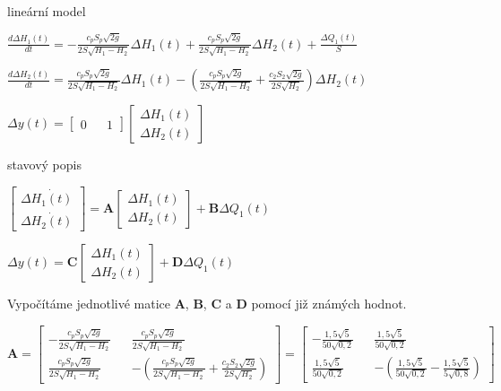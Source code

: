 \documentclass{article}
\begin{document}
			\begin{center}
			lineární model
			
			\bigskip
			
			$\frac{d\Delta H_1(t)}{dt}=-\frac{c_pS_p\sqrt{2g}}{2S\sqrt{H_1-H_2}}\Delta H_1(t)+\frac{c_pS_p\sqrt{2g}}{2S\sqrt{H_1-H_2}}\Delta H_2(t)+\frac{\Delta Q_1(t)}{S}$
			
			\bigskip
			
			$\frac{d\Delta H_2(t)}{dt}=\frac{c_pS_p\sqrt{2g}}{2S\sqrt{H_1-H_2}}\Delta H_1(t)-(\frac{c_pS_p\sqrt{2g}}{2S\sqrt{H_1-H_2}}+\frac{c_2S_2\sqrt{2g}}{2S\sqrt{H_2}})\Delta H_2(t)$
			
			\bigskip
			
			$\Delta y(t)=\begin{bmatrix}
			0 && 1
			\end{bmatrix}
			\begin{bmatrix}
				\Delta H_1(t)\\
				\Delta H_2(t)
			\end{bmatrix}$
			
			\bigskip
			
			stavový popis
			
			\bigskip
			
			$\begin{bmatrix}
			\Delta \dot{H_1(t)}\\
			\Delta \dot{H_2(t)}
			\end{bmatrix}=\textbf{A}\begin{bmatrix}
			\Delta H_1(t)\\
			\Delta H_2(t)
			\end{bmatrix}+\textbf{B}\Delta Q_1(t)$
			
			\bigskip
			
			$\Delta y(t)=\textbf{C}\begin{bmatrix}
			\Delta H_1(t)\\
			\Delta H_2(t)
			\end{bmatrix}+\textbf{D}\Delta Q_1(t)$
			
\bigskip			
			
			Vypočítáme jednotlivé matice \textbf{A}, \textbf{B}, \textbf{C} a \textbf{D} pomocí již známých hodnot. 

\bigskip			
			
			$\textbf{A}=\begin{bmatrix}
			-\frac{c_pS_p\sqrt{2g}}{2S\sqrt{H_1-H_2}} && \frac{c_pS_p\sqrt{2g}}{2S\sqrt{H_1-H_2}} \\
			\frac{c_pS_p\sqrt{2g}}{2S\sqrt{H_1-H_2}} && -\left(\frac{c_pS_p\sqrt{2g}}{2S\sqrt{H_1-H_2}}+\frac{c_2S_2\sqrt{2g}}{2S\sqrt{H_2}}\right)
			\end{bmatrix}=\begin{bmatrix}
			-\frac{1,5\sqrt{5}}{50\sqrt{0,2}} && \frac{1,5\sqrt{5}}{50\sqrt{0,2}}\\
			\frac{1,5\sqrt{5}}{50\sqrt{0,2}}&& -\left(\frac{1,5\sqrt{5}}{50\sqrt{0,2}}-\frac{1,5\sqrt{5}}{5\sqrt{0,8}}\right)
			\end{bmatrix}$
			

\end{center}
\end{document}
